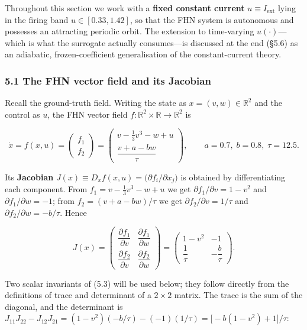 \documentclass[
  11pt,
]{article}
\begin{document}
Throughout this section we work with a \textbf{fixed constant current}
\(u\equiv I_{\text{ext}}\) lying in the firing band \(u\in[0.33,1.42]\),
so that the FHN system is autonomous and possesses an attracting
periodic orbit. The extension to time-varying \(u(\cdot)\)---which is
what the surrogate actually consumes---is discussed at the end (§5.6) as
an adiabatic, frozen-coefficient generalisation of the constant-current
theory.

\subsubsection{5.1 The FHN vector field and its
Jacobian}\label{the-fhn-vector-field-and-its-jacobian}

Recall the ground-truth field. Writing the state as
\(x=(v,w)\in\mathbb{R}^2\) and the control as \(u\), the FHN vector
field \(f:\mathbb{R}^2\times\mathbb{R}\to\mathbb{R}^2\) is

\[
\dot x = f(x,u)=
\begin{pmatrix} f_1 \\ f_2 \end{pmatrix}
=
\begin{pmatrix}
v-\tfrac{1}{3}v^3-w+u\\[2pt]
\dfrac{v+a-bw}{\tau}
\end{pmatrix},
\qquad a=0.7,\; b=0.8,\; \tau=12.5.
\tag{5.2}
\]

Its \textbf{Jacobian}
\(J(x)\equiv D_xf(x,u)=\big(\partial f_i/\partial x_j\big)\) is obtained
by differentiating each component. From \(f_1=v-\tfrac13 v^3-w+u\) we
get \(\partial f_1/\partial v=1-v^2\) and
\(\partial f_1/\partial w=-1\); from \(f_2=(v+a-bw)/\tau\) we get
\(\partial f_2/\partial v=1/\tau\) and
\(\partial f_2/\partial w=-b/\tau\). Hence

\[
J(x)=
\begin{pmatrix}
\dfrac{\partial f_1}{\partial v} & \dfrac{\partial f_1}{\partial w}\\[8pt]
\dfrac{\partial f_2}{\partial v} & \dfrac{\partial f_2}{\partial w}
\end{pmatrix}
=
\begin{pmatrix}
1-v^2 & -1\\[4pt]
\dfrac{1}{\tau} & -\dfrac{b}{\tau}
\end{pmatrix}.
\tag{5.3}
\]

Two scalar invariants of (5.3) will be used below; they follow directly
from the definitions of trace and determinant of a \(2\times2\) matrix.
The trace is the sum of the diagonal, and the determinant is
\(J_{11}J_{22}-J_{12}J_{21}=(1-v^2)(-b/\tau)-(-1)(1/\tau)=\big[-b(1-v^2)+1\big]/\tau\):
\end{document}
